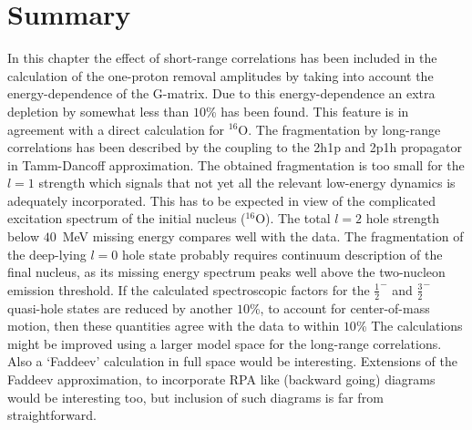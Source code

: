\section{Summary}
In this chapter the effect of short-range correlations has been included in the 
calculation of the one-proton removal amplitudes by taking into 
account the energy-dependence of the G-matrix. Due to this 
energy-dependence an extra depletion by somewhat less than $10$\%
has been found. This feature is in agreement with a direct calculation 
for $^{16}$O\cite{MPD95}.
The fragmentation by long-range correlations has been described by the 
coupling to 
the 2h1p and 2p1h propagator in Tamm-Dancoff approximation. The obtained 
fragmentation is too small for the $l=1$ strength which signals that not yet 
all the relevant low-energy dynamics is adequately incorporated.
This has to be expected in view of the complicated excitation spectrum of the 
initial nucleus ($^{16}$O). 
The  total $l=2$ hole strength below $40$~MeV missing energy compares well 
with the data. The fragmentation of the deep-lying $l=0$ hole state probably 
requires  continuum description of the final nucleus, as its missing energy 
spectrum peaks well above the two-nucleon emission threshold. 
If the calculated spectroscopic factors for the $\frac{1}{2}^-$ and 
$\frac{3}{2}^-$ quasi-hole states are reduced by another $10$\%, to account 
for center-of-mass motion\cite{RBP94}, then these quantities agree with the 
data to within $10$\%
The calculations might be improved using a larger model space for the
long-range correlations. Also a `Faddeev' calculation in full space would be
interesting. Extensions of the Faddeev approximation, to incorporate RPA like
(backward going) diagrams would be interesting too, but inclusion of such 
diagrams is far from straightforward\cite{Rij93}.

